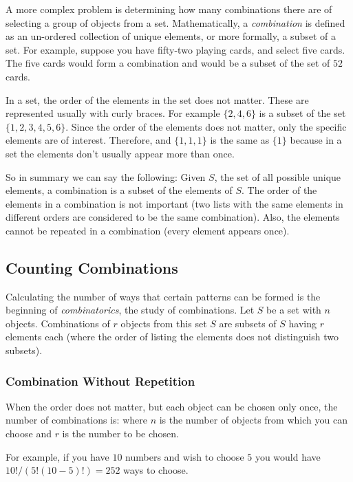 A more complex problem is determining how many combinations there are of selecting a group of objects from a set. Mathematically, a \textit{combination} is defined as an un-ordered collection of unique elements, or more formally, a subset of a set. For example, suppose you have fifty-two playing cards, and select five cards. The five cards would form a combination and would be a subset of the set of $52$ cards.

In a set, the order of the elements in the set does not matter. These are represented usually with curly braces. For example $\{2, 4, 6\}$ is a subset of the set $\{1, 2, 3, 4, 5, 6\}$. Since the order of the elements does not matter, only the specific elements are of interest. Therefore,
and $\{1, 1, 1\}$ is the same as $\{1\}$ because in a set the elements don't usually appear more than once.

So in summary we can say the following:
Given $S$, the set of all possible unique elements, a combination is a subset of the elements of $S$. The order of the elements in a combination is not important (two lists with the same elements in different orders are considered to be the same combination). Also, the elements cannot be repeated in a combination (every element appears once).

\subsection{Counting Combinations}
Calculating the number of ways that certain patterns can be formed is the beginning of \mbox{\textit{combinatorics}}, the study of combinations. Let $S$ be a set with $n$ objects. Combinations of $r$ objects from this set $S$ are subsets of $S$ having $r$ elements each (where the order of listing the elements does not distinguish two subsets).

\subsubsection{Combination Without Repetition}

When the order does not matter, but each object can be chosen only once, the number of combinations is:
where $n$ is the number of objects from which you can choose and $r$ is the number to be chosen.

For example, if you have $10$ numbers and wish to choose $5$ you would have $10!/(5!(10 - 5)!) = 252$ ways to choose.

